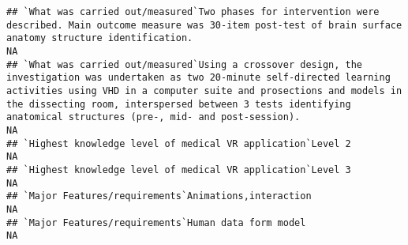 \documentclass[]{article}
\begin{document}
\begin{verbatim}
## `What was carried out/measured`Two phases for intervention were described. Main outcome measure was 30-item post-test of brain surface anatomy structure identification.                                                                                                                                                                                                                                                                                                              NA
## `What was carried out/measured`Using a crossover design, the investigation was undertaken as two 20-minute self-directed learning activities using VHD in a computer suite and prosections and models in the dissecting room, interspersed between 3 tests identifying anatomical structures (pre-, mid- and post-session).                                                                                                                                                           NA
## `Highest knowledge level of medical VR application`Level 2                                                                                                                                                                                                                                                                                                                                                                                                                            NA
## `Highest knowledge level of medical VR application`Level 3                                                                                                                                                                                                                                                                                                                                                                                                                            NA
## `Major Features/requirements`Animations,interaction                                                                                                                                                                                                                                                                                                                                                                                                                                   NA
## `Major Features/requirements`Human data form model                                                                                                                                                                                                                                                                                                                                                                                                                                    NA

\end{verbatim}
\end{document}
